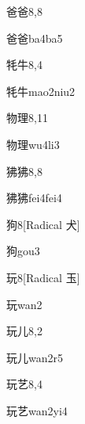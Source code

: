 \begin{entry}{爸爸}{8,8}
  \begin{phonetics}{爸爸}{ba4ba5}
  \end{phonetics}
\end{entry}

\begin{entry}{牦牛}{8,4}
  \begin{phonetics}{牦牛}{mao2niu2}
  \end{phonetics}
\end{entry}

\begin{entry}{物理}{8,11}
  \begin{phonetics}{物理}{wu4li3}
  \end{phonetics}
\end{entry}

\begin{entry}{狒狒}{8,8}
  \begin{phonetics}{狒狒}{fei4fei4}
  \end{phonetics}
\end{entry}

\begin{entry}{狗}{8}[Radical 犬]
  \begin{phonetics}{狗}{gou3}
  \end{phonetics}
\end{entry}

\begin{entry}{玩}{8}[Radical 玉]
  \begin{phonetics}{玩}{wan2}
  \end{phonetics}
\end{entry}

\begin{entry}{玩儿}{8,2}
  \begin{phonetics}{玩儿}{wan2r5}
  \end{phonetics}
\end{entry}

\begin{entry}{玩艺}{8,4}
  \begin{phonetics}{玩艺}{wan2yi4}
  \end{phonetics}
\end{entry}

